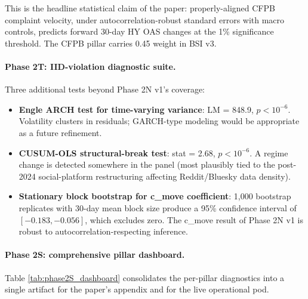\documentclass[11pt,a4paper]{article}
\begin{document}
This is the headline statistical claim of the paper: properly-aligned CFPB complaint velocity, under autocorrelation-robust standard errors with macro controls, predicts forward 30-day HY OAS changes at the 1\% significance threshold. The CFPB pillar carries 0.45 weight in BSI v3.

\paragraph{Phase 2T: IID-violation diagnostic suite.} Three additional tests beyond Phase 2N v1's coverage:
\begin{itemize}
\item \textbf{Engle ARCH test for time-varying variance}: LM = 848.9, $p < 10^{-6}$. Volatility clusters in residuals; GARCH-type modeling would be appropriate as a future refinement.
\item \textbf{CUSUM-OLS structural-break test}: stat = 2.68, $p < 10^{-6}$. A regime change is detected somewhere in the panel (most plausibly tied to the post-2024 social-platform restructuring affecting Reddit/Bluesky data density).
\item \textbf{Stationary block bootstrap for c\_move coefficient}: 1{,}000 bootstrap replicates with 30-day mean block size produce a 95\% confidence interval of $[-0.183, -0.056]$, which excludes zero. The c\_move result of Phase 2N v1 is robust to autocorrelation-respecting inference.
\end{itemize}

\paragraph{Phase 2S: comprehensive pillar dashboard.} Table \ref{tab:phase2S_dashboard} consolidates the per-pillar diagnostics into a single artifact for the paper's appendix and for the live operational pod.
\end{document}
